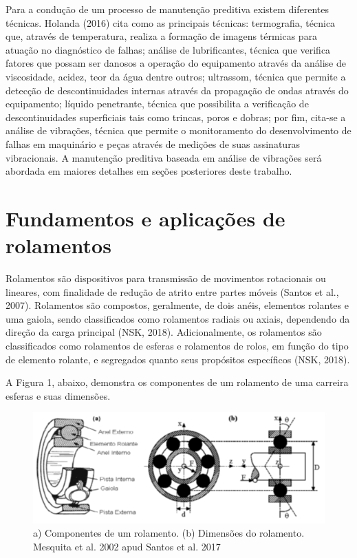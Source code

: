 \documentclass[
	12pt,				
	oneside,			
	a4paper,			
	english,			
	brazil				
	]{abntex2ppgsi}
\begin{document}
Para a condução de um processo de manutenção preditiva existem diferentes técnicas. Holanda (2016) cita como as principais técnicas: termografia, técnica que, através de temperatura, realiza a formação de imagens térmicas para atuação no diagnóstico de falhas; análise de lubrificantes, técnica que verifica fatores que possam ser danosos a operação do equipamento através da análise de viscosidade, acidez, teor da água dentre outros; ultrassom, técnica que permite a detecção de descontinuidades internas através da propagação de ondas através do equipamento; líquido penetrante, técnica que possibilita a verificação de descontinuidades superficiais tais como trincas, poros e dobras; por fim, cita-se a análise de vibrações, técnica que permite o monitoramento do desenvolvimento de falhas em maquinário e peças através de medições de suas assinaturas vibracionais. A manutenção preditiva baseada em análise de vibrações será abordada em maiores detalhes em seções posteriores deste trabalho.

\section{\textbf{Fundamentos e aplicações de rolamentos}}
Rolamentos são dispositivos para transmissão de movimentos rotacionais ou lineares, com finalidade de redução de atrito entre partes móveis (Santos et al., 2007). Rolamentos são compostos, geralmente, de dois anéis, elementos rolantes e uma gaiola, sendo classificados como rolamentos radiais ou axiais, dependendo da direção da carga principal (NSK, 2018). Adicionalmente, os rolamentos são classificados como rolamentos de esferas e rolamentos de rolos, em função do tipo de elemento rolante, e segregados quanto seus propósitos específicos (NSK, 2018).

A Figura 1, abaixo, demonstra os componentes de um rolamento de uma carreira esferas e suas dimensões. 

\begin{figure}[!htb]
\centering
\includegraphics{Figura1}
\caption{a) Componentes de um rolamento. (b) Dimensões do rolamento. Mesquita et al. 2002 apud Santos et al. 2017}
\label{Figura1}
\end{figure}
\end{document}
